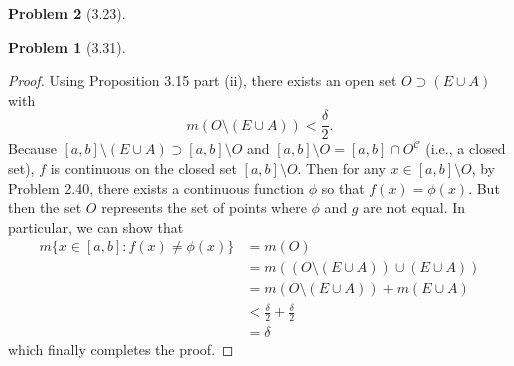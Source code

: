 \documentclass[12pt]{article}
\newcommand{\C}{\mathscr{C}}
\theoremstyle{definition}
\newtheorem{problem}{Problem}
\begin{document}
\begin{problem}[3.23]
\begin{problem}[3.31]
\begin{proof}
        Using Proposition 3.15 part (ii), there exists an open set \( O \supset (E \cup A ) \) with 
            \[ 
                m(O \setminus (E \cup A)) < \frac{\delta}{2}.
            \]
        Because \( [a,b] \setminus (E \cup A) \supset [a,b] \setminus O \) and \( [a,b] \setminus O = [a,b] \cap O^{\C} \) (i.e., a closed set), \( f \) is continuous on the closed set \( [a,b] \setminus O \). Then for any \( x \in [a,b] \setminus O \), by Problem 2.40, there exists a continuous function \( \phi \) so that \( f(x) = \phi(x) \). But then the set \( O \) represents the set of points where \( \phi \) and \( g \) are not equal. In particular, we can show that 
            \begin{align*}
                m \{x \in [a,b]: f(x) \neq \phi(x) \} &= m(O) \\
                                            &= m( (O \setminus (E \cup A)) \cup (E \cup A)) \\
                                            &= m(O \setminus (E \cup A)) + m(E \cup A) \\
                                            &< \frac{\delta}{2} + \frac{\delta}{2} \\
                                            &= \delta
            \end{align*}
        which finally completes the proof.
    \end{proof}
    
\end{problem}
    
\end{problem}
\end{document}
